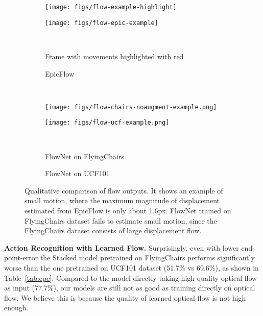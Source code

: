 \documentclass[10pt,twocolumn,letterpaper]{article}
\begin{document}
\begin{figure}[h!]
\begin{center}
  \begin{subfigure}[ht]{0.45\linewidth}
      \texttt{[image: figs/flow-example-highlight]}
  \end{subfigure} 
  \begin{subfigure}[ht]{0.45\linewidth}
      \texttt{[image: figs/flow-epic-example]}
  \end{subfigure}
  \\
  \begin{subfigure}[ht]{0.45\linewidth}
      \caption{Frame with movements highlighted with red}
  \end{subfigure} 
  \begin{subfigure}[ht]{0.45\linewidth}
      \caption{EpicFlow}
  \end{subfigure}
  \vspace{-.5em}
  \\
  \begin{subfigure}[ht]{0.45\linewidth}
      \texttt{[image: figs/flow-chairs-noaugment-example.png]}
  \end{subfigure}
  \begin{subfigure}[ht]{0.45\linewidth}
      \texttt{[image: figs/flow-ucf-example.png]}
  \end{subfigure}
  \\
  \begin{subfigure}[ht]{0.45\linewidth}
      \caption{FlowNet on FlyingChairs}
  \end{subfigure}
  \begin{subfigure}[ht]{0.45\linewidth}
      \caption{FlowNet on UCF101}
  \end{subfigure}

  \vspace{-1em}
  \caption{Qualitative comparison of flow outputs. It shows an example of small motion, where the maximum magnitude of displacement estimated from EpicFlow is only about 1.6px. FlowNet trained on FlyingChairs dataset fails to estimate small motion, since the FlyingChairs dataset consists of large displacement flow.}
  \label{fig:flow-example}
  \vspace{-1.5em}
\end{center}
\end{figure}



\noindent\textbf{Action Recognition with Learned Flow.}
Surprisingly, even with lower end-point-error the Stacked model pretrained on FlyingChairs performs significantly worse than the one pretrained on UCF101 dataset (51.7\% vs 69.6\%), as shown in Table~\ref{tab:epe}.
Compared to the model directly taking high quality optical flow as input ($77.7\%$), our models are still not as good as training directly on optical flow.
We believe this is because the quality of learned optical flow is not high enough.
\end{document}
